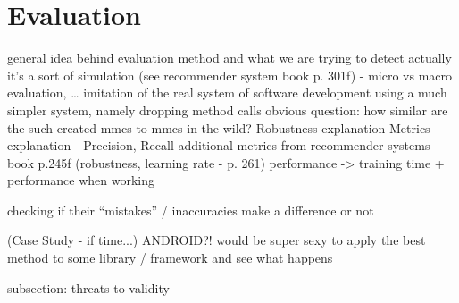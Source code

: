 \chapter{Evaluation}
general idea behind evaluation method and what we are trying to detect
actually it's a sort of simulation (see recommender system book p. 301f) - micro vs macro evaluation, \ldots
    imitation of the real system of software development
    using a much simpler system, namely dropping method calls
    obvious question: how similar are the such created mmcs to mmcs in the wild?
Robustness explanation
Metrics explanation - Precision, Recall
    additional metrics from recommender systems book p.245f (robustness, learning rate - p. 261)
    performance -> training time + performance when working


checking if their ``mistakes'' / inaccuracies make a difference or not

(Case Study - if time...)
    ANDROID?!
    would be super sexy to apply the best method to some library / framework and see what happens

subsection: threats to validity

